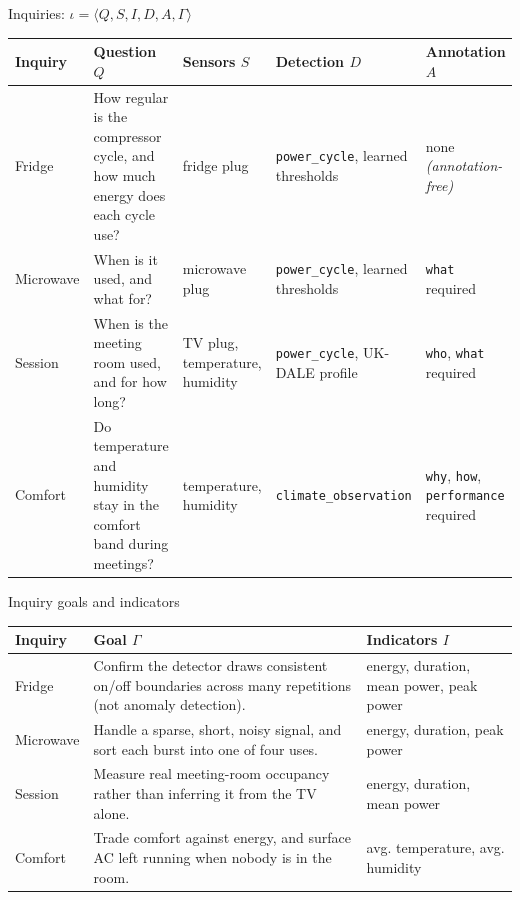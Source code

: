 \begin{frame}{Inquiries: $\iota=\langle Q,S,I,D,A,\Gamma\rangle$}
  \scriptsize
  \setlength{\tabcolsep}{3pt}
  \renewcommand{\arraystretch}{1.35}
  \begin{tabular}{L{0.11\textwidth}|L{0.26\textwidth}|L{0.16\textwidth}|L{0.16\textwidth}|L{0.19\textwidth}}
    \textbf{Inquiry} & \textbf{Question $Q$} & \textbf{Sensors $S$}
      & \textbf{Detection $D$} & \textbf{Annotation $A$} \\
    \hline
    Fridge & How regular is the compressor cycle, and how much energy does each cycle use?
      & fridge plug & \texttt{power\_cycle}, learned thresholds & none \emph{(annotation-free)} \\
    Microwave & When is it used, and what for?
      & microwave plug & \texttt{power\_cycle}, learned thresholds & \texttt{what} required \\
    Session & When is the meeting room used, and for how long?
      & TV plug, temperature, humidity & \texttt{power\_cycle}, UK-DALE profile
      & \texttt{who}, \texttt{what} required \\
    Comfort & Do temperature and humidity stay in the comfort band during meetings?
      & temperature, humidity & \texttt{climate\_\allowbreak observation}
      & \texttt{why}, \texttt{how}, \texttt{performance} required \\
  \end{tabular}
\end{frame}

\begin{frame}{Inquiry goals and indicators}
  \footnotesize
  \setlength{\tabcolsep}{3pt}
  \renewcommand{\arraystretch}{1.5}
  \begin{tabular}{L{0.13\textwidth}|L{0.47\textwidth}|L{0.24\textwidth}}
    \textbf{Inquiry} & \textbf{Goal $\Gamma$} & \textbf{Indicators $I$} \\
    \hline
    Fridge & Confirm the detector draws consistent on/off boundaries across many
      repetitions (not anomaly detection).
      & energy, duration, mean power, peak power \\
    Microwave & Handle a sparse, short, noisy signal, and sort each burst into one
      of four uses.
      & energy, duration, peak power \\
    Session & Measure real meeting-room occupancy rather than inferring it from the
      TV alone.
      & energy, duration, mean power \\
    Comfort & Trade comfort against energy, and surface AC left running when nobody
      is in the room.
      & avg. temperature, avg. humidity \\
  \end{tabular}
\end{frame}

